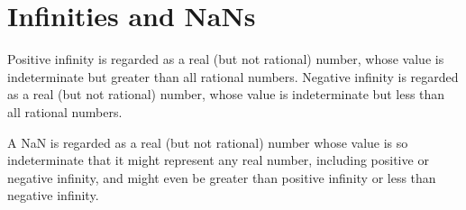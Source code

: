 \section{Infinities and NaNs}

Positive infinity is regarded as a real (but not rational) number,
whose value is indeterminate but greater than all rational numbers.
Negative infinity is regarded as a real (but not rational) number,
whose value is indeterminate but less than all rational numbers.

A NaN is regarded as a real (but not rational) number whose value is
so indeterminate that it might represent any real number, including
positive or negative infinity, and might even be greater than positive
infinity or less than negative infinity.


